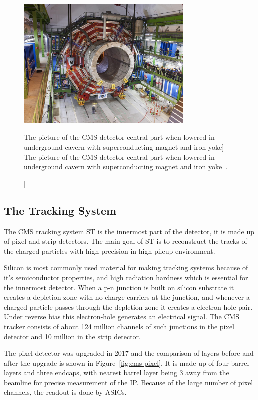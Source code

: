 \begin{figure}[!ht]
  \centering
  \includegraphics[width=0.75\textwidth]{figures/cms_magnet_lowered.jpg}
  \caption%
  [The picture of the CMS detector central part when lowered in underground
    cavern with superconducting magnet and iron
    yoke]%
  {The picture of the CMS detector central part when lowered in underground
    cavern with superconducting magnet and iron
    yoke~\cite{image-cms-magnet}.}%
  \label{fig:cms-magnet}
\end{figure}


\subsection{
  The Tracking System
}

The \gls{CMS} tracking system \gls{ST} is the innermost part of the detector, it
is made up of pixel and strip detectors. The main goal of \gls{ST} is to
reconstruct the tracks of the charged particles with high precision in high pileup
environment.

Silicon is most commonly used material for making tracking systems because of it's
semiconductor properties, and high radiation hardness which is essential for the
innermost detector. When a p-n junction is built on silicon substrate it creates
a depletion zone with no charge carriers at the junction, and whenever
a charged particle passes through the depletion zone it creates a electron-hole pair.
Under reverse bias this electron-hole generates an electrical signal. The \gls{CMS}
tracker consists of about 124 million channels of such junctions in the
pixel detector and 10 million in the strip detector.

The pixel detector was upgraded in 2017 and the comparison of layers before
and after the upgrade is shown in Figure~\ref{fig:cms-pixel}. It is made up of
four barrel layers and three endcaps, with nearest barrel layer being 3\cm{}
away from the beamline for precise measurement of the \gls{IP}.
Because of the large number of pixel channels, the readout is done by \glspl{ASIC}.

